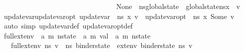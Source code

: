\begin{isabellebody}
\ \ \ \ \ \ \ \ \ \ \ \ \ \ \ \ \ \ \ \ \ \ \ \ \ \ \ \ \ \ \ \ \ None\ {\isasymRightarrow}\ n{\isacharunderscore}{\kern0pt}s{\isasymlparr}global{\isacharunderscore}{\kern0pt}state\ {\isacharcolon}{\kern0pt}{\isacharequal}{\kern0pt}\ {\isacharparenleft}{\kern0pt}global{\isacharunderscore}{\kern0pt}state{\isacharparenleft}{\kern0pt}n{\isacharunderscore}{\kern0pt}s{\isacharparenright}{\kern0pt}{\isacharparenright}{\kern0pt}{\isacharparenleft}{\kern0pt}x\ {\isacharcolon}{\kern0pt}{\isacharequal}{\kern0pt}\ v{\isacharparenright}{\kern0pt}\ {\isasymrparr}{\isacharparenright}{\kern0pt}{\isachardoublequoteclose}\isanewline
\isanewline
{}\isamarkupfalse%
\ update{\isacharunderscore}{\kern0pt}var{\isacharunderscore}{\kern0pt}update{\isacharunderscore}{\kern0pt}var{\isacharunderscore}{\kern0pt}opt{\isacharcolon}{\kern0pt}\ {\isachardoublequoteopen}update{\isacharunderscore}{\kern0pt}var\ {\isasymLambda}\ n{\isacharunderscore}{\kern0pt}s\ x\ v\ {\isacharequal}{\kern0pt}\ update{\isacharunderscore}{\kern0pt}var{\isacharunderscore}{\kern0pt}opt\ {\isasymLambda}\ n{\isacharunderscore}{\kern0pt}s\ x\ {\isacharparenleft}{\kern0pt}Some\ v{\isacharparenright}{\kern0pt}{\isachardoublequoteclose}\isanewline
%
\isadelimproof
\ \ %
\endisadelimproof
%
\isatagproof
{}\isamarkupfalse%
\ {\isacharparenleft}{\kern0pt}auto\ simp{\isacharcolon}{\kern0pt}\ update{\isacharunderscore}{\kern0pt}var{\isacharunderscore}{\kern0pt}def\ update{\isacharunderscore}{\kern0pt}var{\isacharunderscore}{\kern0pt}opt{\isacharunderscore}{\kern0pt}def{\isacharparenright}{\kern0pt}%
\endisatagproof
{\isafoldproof}%
%
\isadelimproof
\isanewline
%
\endisadelimproof
\isanewline
{}\isamarkupfalse%
\ full{\isacharunderscore}{\kern0pt}ext{\isacharunderscore}{\kern0pt}env\ {\isacharcolon}{\kern0pt}{\isacharcolon}{\kern0pt}\ {\isachardoublequoteopen}{\isacharparenleft}{\kern0pt}{\isacharprime}{\kern0pt}a{\isacharcomma}{\kern0pt}\ {\isacharprime}{\kern0pt}m{\isacharparenright}{\kern0pt}\ nstate\ {\isasymRightarrow}\ {\isacharparenleft}{\kern0pt}{\isacharprime}{\kern0pt}a{\isacharcomma}{\kern0pt}\ {\isacharprime}{\kern0pt}m{\isacharparenright}{\kern0pt}\ val\ {\isasymRightarrow}\ {\isacharparenleft}{\kern0pt}{\isacharprime}{\kern0pt}a{\isacharcomma}{\kern0pt}\ {\isacharprime}{\kern0pt}m{\isacharparenright}{\kern0pt}\ nstate{\isachardoublequoteclose}\isanewline
\ \ \ {\isachardoublequoteopen}full{\isacharunderscore}{\kern0pt}ext{\isacharunderscore}{\kern0pt}env\ n{\isacharunderscore}{\kern0pt}s\ v\ {\isacharequal}{\kern0pt}\ n{\isacharunderscore}{\kern0pt}s{\isasymlparr}\ binder{\isacharunderscore}{\kern0pt}state\ {\isacharcolon}{\kern0pt}{\isacharequal}{\kern0pt}\ ext{\isacharunderscore}{\kern0pt}env\ {\isacharparenleft}{\kern0pt}binder{\isacharunderscore}{\kern0pt}state\ n{\isacharunderscore}{\kern0pt}s{\isacharparenright}{\kern0pt}\ v\ {\isasymrparr}{\isachardoublequoteclose}\isanewline

\end{isabellebody}
